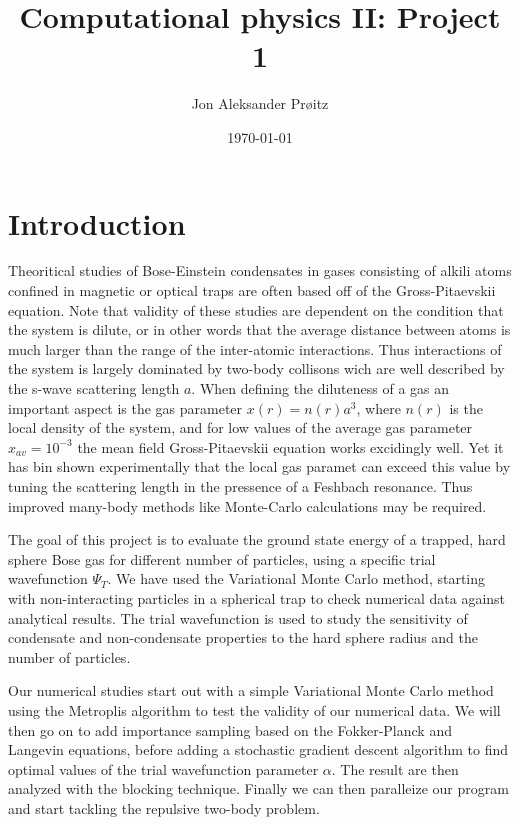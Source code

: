 \documentclass[a4paper, 10pt, english]{revtex4-2} %
\begin{document}
\vspace*{1.5cm}
\title{\LARGE Computational physics II: Project 1}
\author{Jon Aleksander Prøitz}
\date{\today}
\noaffiliation
\maketitle

\section*{\large Introduction}
    Theoritical studies of Bose-Einstein condensates in gases consisting of alkili atoms confined in magnetic or optical traps are often based off of the Gross-Pitaevskii equation. 
    Note that validity of these studies are dependent on the condition that the system is dilute, or in other words that the average distance between atoms is much larger than the range of the inter-atomic interactions. 
    Thus interactions of the system is largely dominated by two-body collisons wich are well described by the s-wave scattering length $a$.
    When defining the diluteness of a gas an important aspect is the gas parameter $x(r) = n(r)a^3$, where $n(r)$ is the local density of the system, and for low values of the average gas parameter $x_{av} = 10^{-3}$ the mean field Gross-Pitaevskii equation works excidingly well.
    Yet it has bin shown experimentally that the local gas paramet can exceed this value by tuning the scattering length in the pressence of a Feshbach resonance.
    Thus improved many-body methods like Monte-Carlo calculations may be required.


    The goal of this project is to evaluate the ground state energy of a trapped, hard sphere Bose gas for different number of particles, using a specific trial wavefunction $\Psi_T$.
    We have used the Variational Monte Carlo method, starting with non-interacting particles in a spherical trap to check numerical data against analytical results.
    The trial wavefunction is used to study the sensitivity of condensate and non-condensate properties to the hard sphere radius and the number of particles.

    Our numerical studies start out with a simple Variational Monte Carlo method using the Metroplis algorithm to test the validity of our numerical data.
    We will then go on to add importance sampling based on the Fokker-Planck and Langevin equations, before adding a stochastic gradient descent algorithm to find optimal values of the trial wavefunction parameter $\alpha$.
    The result are then analyzed with the blocking technique.
    Finally we can then paralleize our program and start tackling the repulsive two-body problem.
\end{document}
